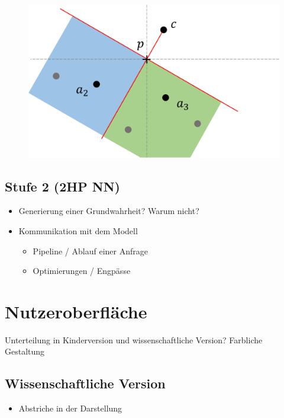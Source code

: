 \documentclass[a4paper]{extarticle}
\begin{document}
    \begin{figure}[!ht]
        \centering	
        \includegraphics[scale=0.15]{bilder/tri_konstr.pdf}
        \label{fig:triangulation_hilfssatz_2}
    \end{figure}
    
    \subsection{Stufe 2 (2HP NN)}
    \begin{itemize}
        \item Generierung einer Grundwahrheit? Warum nicht?
        \item Kommunikation mit dem Modell
        \begin{itemize}
            \item Pipeline / Ablauf einer Anfrage
            \item Optimierungen / Engpässe
        \end{itemize}
    \end{itemize}

    \section{Nutzeroberfläche}

    Unterteilung in Kinderversion und wissenschaftliche Version?
    Farbliche Gestaltung
    
    \subsection{Wissenschaftliche Version}
    \begin{itemize}
        \item Abstriche in der Darstellung
    \end{itemize}
\end{document}
